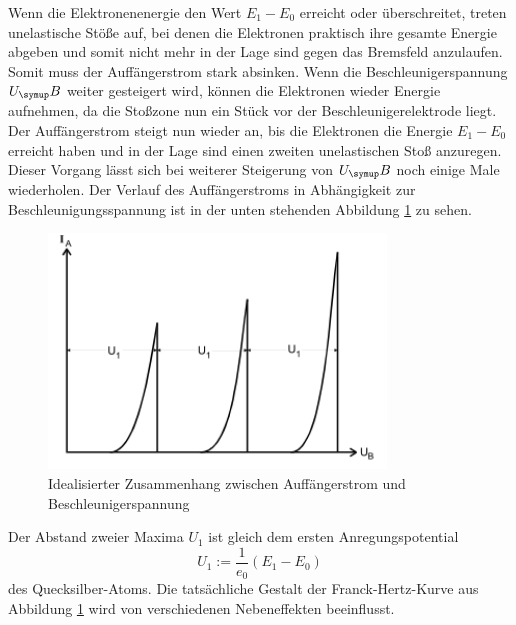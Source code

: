 Wenn die Elektronenenergie den Wert $E_1-E_0$ erreicht oder überschreitet, treten
unelastische Stöße auf, bei denen die Elektronen praktisch ihre gesamte Energie
abgeben und somit nicht mehr in der Lage sind gegen das Bremsfeld anzulaufen.
Somit muss der Auffängerstrom stark absinken.
Wenn die Beschleunigerspannung $U_\su{B}$ weiter gesteigert wird, können die
Elektronen wieder Energie aufnehmen, da die Stoßzone nun ein Stück vor der
Beschleunigerelektrode liegt.
Der Auffängerstrom steigt nun wieder an, bis die Elektronen die Energie $E_1-E_0$
erreicht haben und in der Lage sind einen zweiten unelastischen Stoß anzuregen.
Dieser Vorgang lässt sich bei weiterer Steigerung von $U_\su{B}$ noch einige
Male wiederholen. Der Verlauf des Auffängerstroms in Abhängigkeit zur
Beschleunigungsspannung ist in der unten stehenden Abbildung \ref{fig:kurve} zu
sehen.
\begin{figure}
  \centering
  \includegraphics[width=0.8\textwidth]{bilder/kurve.pdf}
  \caption{Idealisierter Zusammenhang zwischen Auffängerstrom und Beschleunigerspannung
  \cite{601}}
  \label{fig:kurve}
\end{figure}
Der Abstand zweier Maxima $U_1$ ist gleich dem ersten Anregungspotential
\begin{equation*}
  U_1:=\frac{1}{e_0}(E_1-E_0)
\end{equation*}
des Quecksilber-Atoms.
Die tatsächliche Gestalt der Franck-Hertz-Kurve aus Abbildung \ref{fig:kurve}
wird von verschiedenen Nebeneffekten beeinflusst.

